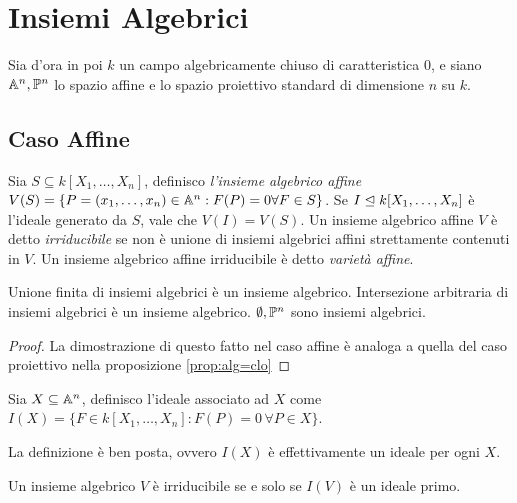     \newpage
    \section{Insiemi Algebrici}
        Sia d'ora in poi $k$ un campo algebricamente chiuso di caratteristica $0$, e siano $\A^n,\P^n$ lo spazio affine e lo spazio proiettivo standard di dimensione $n$ su $k$.
        \subsection{Caso Affine}
            \begin{definizione}
                Sia $S \subseteq k[X_1,\ldots,X_n]$, definisco \emph{l'insieme algebrico affine} $V(S) = \{P = (x_1,\ldots,x_n) \in \A^n : 
                F(P) = 0 \forall F \in S\}$. Se $I \ideal k[X_1,\ldots,X_n]$ è l'ideale generato da $S$, vale che $V(I) = V(S)$. Un insieme 
                algebrico affine $V$ è detto \emph{irriducibile} se non è unione di insiemi algebrici affini strettamente contenuti in $V$. 
                Un insieme algebrico affine irriducibile è detto \emph{varietà affine}.
            \end{definizione}
            \begin{proposizione}
                Unione finita di insiemi algebrici è un insieme algebrico. Intersezione arbitraria di insiemi algebrici è un insieme algebrico. $\emptyset,\P^n$ 
                sono insiemi algebrici.
            \end{proposizione}
            \begin{proof}
                La dimostrazione di questo fatto nel caso affine è analoga a quella del caso proiettivo nella proposizione \ref{prop:alg=clo}
            \end{proof}
            \begin{definizione}
                Sia $X \subseteq \A^n$, definisco l'ideale associato ad $X$ come $I(X) = \{F \in k[X_1,\ldots,X_n] : F(P) = 0 \, \forall P \in X\}$.
            \end{definizione}     
            \begin{osservazione}
                La definizione è ben posta, ovvero $I(X)$ è effettivamente un ideale per ogni $X$.
            \end{osservazione}
            \begin{proposizione}
                Un insieme algebrico $V$ è irriducibile se e solo se $I(V)$ è un ideale primo.
            \end{proposizione}
